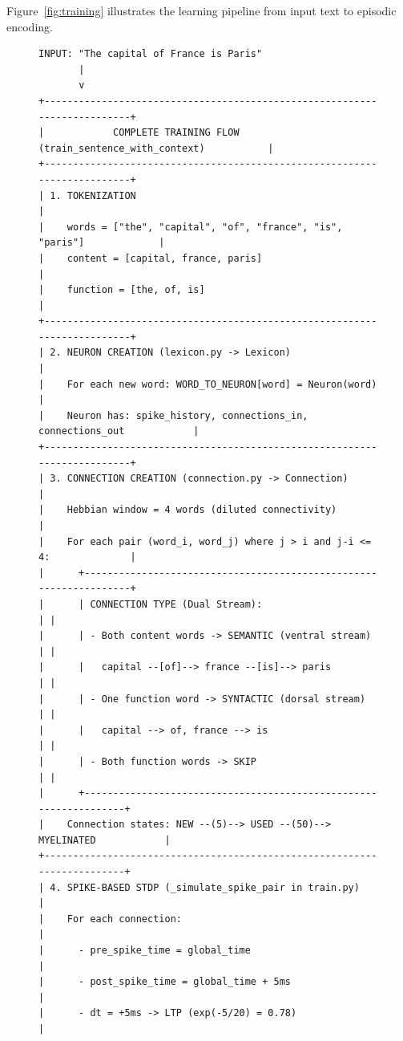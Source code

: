 \documentclass[11pt]{article}
\begin{document}
Figure~\ref{fig:training} illustrates the learning pipeline from input text to episodic encoding.

\begin{figure}[ht]
\centering
\begin{Verbatim}[fontsize=\tiny,frame=single]
INPUT: "The capital of France is Paris"
       |
       v
+--------------------------------------------------------------------------+
|            COMPLETE TRAINING FLOW (train_sentence_with_context)           |
+--------------------------------------------------------------------------+
| 1. TOKENIZATION                                                          |
|    words = ["the", "capital", "of", "france", "is", "paris"]             |
|    content = [capital, france, paris]                                    |
|    function = [the, of, is]                                              |
+--------------------------------------------------------------------------+
| 2. NEURON CREATION (lexicon.py -> Lexicon)                               |
|    For each new word: WORD_TO_NEURON[word] = Neuron(word)                |
|    Neuron has: spike_history, connections_in, connections_out            |
+--------------------------------------------------------------------------+
| 3. CONNECTION CREATION (connection.py -> Connection)                     |
|    Hebbian window = 4 words (diluted connectivity)                       |
|    For each pair (word_i, word_j) where j > i and j-i <= 4:              |
|      +-------------------------------------------------------------------+  
|      | CONNECTION TYPE (Dual Stream):                                  | |
|      | - Both content words -> SEMANTIC (ventral stream)               | |
|      |   capital --[of]--> france --[is]--> paris                      | |
|      | - One function word -> SYNTACTIC (dorsal stream)                | |
|      |   capital --> of, france --> is                                 | |
|      | - Both function words -> SKIP                                   | |
|      +------------------------------------------------------------------+ 
|    Connection states: NEW --(5)--> USED --(50)--> MYELINATED            |
+-------------------------------------------------------------------------+
| 4. SPIKE-BASED STDP (_simulate_spike_pair in train.py)                  |
|    For each connection:                                                 |
|      - pre_spike_time = global_time                                     |
|      - post_spike_time = global_time + 5ms                              |
|      - dt = +5ms -> LTP (exp(-5/20) = 0.78)                             |

\end{Verbatim}
\end{figure}
\end{document}
